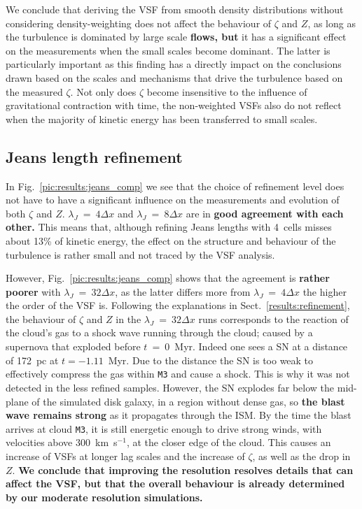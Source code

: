 We conclude that deriving the VSF from smooth density distributions without considering density-weighting does not affect the behaviour of $\zeta$ and $Z$, as long as the turbulence is dominated by large scale \textbf{flows, but} it has a significant effect on the measurements when the small scales become dominant.
The latter is particularly important as this finding has a directly impact on the conclusions drawn based on the scales and mechanisms that drive the turbulence based on the measured $\zeta$.
Not only does $\zeta$ become insensitive to the influence of gravitational contraction with time, the non-weighted VSFs also do not reflect when the majority of kinetic energy has been transferred to small scales. 


\subsection{Jeans length refinement}\label{discussion:refinement}

In Fig.~\ref{pic:results:jeans_comp} we see that the choice of refinement level does not have to have a significant influence on the measurements and evolution of both $\zeta$ and $Z$. 
$\lambda_J$~=~$4\Delta{}x$ and $\lambda_J$~=~$8\Delta{}x$ are in \textbf{good agreement with each other.}
This means that, although refining Jeans lengths with 4~cells misses about 13\% of kinetic energy, the effect on the structure and behaviour of the turbulence is rather small and not traced by the VSF analysis.

However, Fig.~\ref{pic:results:jeans_comp} shows that the agreement is \textbf{rather poorer} with $\lambda_J$~=~$32\Delta{}x$, as the latter differs more from $\lambda_J$~=~$4\Delta{}x$ the higher the order of the VSF is.
Following the explanations in Sect.~\ref{results:refinement}, the behaviour of $\zeta$ and $Z$ in the $\lambda_J$~=~$32\Delta{}x$ runs corresponds to the reaction of the cloud's gas to a shock wave running through the cloud; caused by a supernova that exploded before $t$~=~0~Myr. 
Indeed one sees a SN at a distance of 172~pc at $t=-1.11$~Myr. 
Due to the distance the SN is too weak to effectively compress the gas within \texttt{M3} and cause a shock.
This is why it was not detected in the less refined samples.
However, the SN explodes far below the mid-plane of the simulated disk galaxy, in a region without dense gas, so \textbf{the blast wave remains strong} as it propagates through the ISM. 
By the time the blast arrives at cloud \texttt{M3}, it is still energetic enough to drive strong winds, with velocities above 300~km~s$^{-1}$, at the closer edge of the cloud. 
This causes an increase of VSFs at longer lag scales and the increase of $\zeta$, as well as the drop in $Z$.
\textbf{We conclude that improving the resolution resolves details that can affect the VSF, but that the overall behaviour is already determined by our moderate resolution simulations.}

